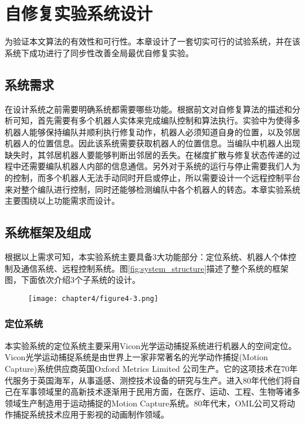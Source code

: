 \chapter{自修复实验系统设计}
为验证本文算法的有效性和可行性。本章设计了一套切实可行的试验系统，并在该系统下成功进行了同步性改善全局最优自修复实验。

\section{系统需求}
在设计系统之前需要明确系统都需要哪些功能。根据前文对自修复算法的描述和分析可知，首先需要有多个机器人实体来完成编队控制和算法执行。实验中为使得多机器人能够保持编队并顺利执行修复动作，机器人必须知道自身的位置，以及邻居机器人的位置信息。因此该系统需要获取机器人的位置信息。当编队中机器人出现缺失时，其邻居机器人要能够判断出邻居的丢失。在梯度扩散与修复状态传递的过程中还需要编队机器人内部的信息通信。另外对于系统的运行与停止需要我们人为的控制，而多个机器人无法手动同时开启或停止，所以需要设计一个远程控制平台来对整个编队进行控制，同时还能够检测编队中各个机器人的转态。本章实验系统主要围绕以上功能需求而设计。

\section{系统框架及组成}
根据以上需求可知，本实验系统主要具备3大功能部分：定位系统、机器人个体控制及通信系统、远程控制系统。图\ref{fig:system_structure}描述了整个系统的框架图，下面依次介绍3个子系统的设计。
\begin{figure}[!htbp]
	\centering
	\texttt{[image: chapter4/figure4-3.png]}
\end{figure}

\subsection{定位系统}
本实验系统的定位系统主要采用Vicon光学运动捕捉系统进行机器人的空间定位。Vicon光学运动捕捉系统是由世界上一家非常著名的光学动作捕捉(Motion Capture)系统供应商英国Oxford Metrics Limited 公司生产。它的这项技术在70年代服务于英国海军，从事遥感、测控技术设备的研究与生产。进入80年代他们将自己在军事领域里的高新技术逐渐用于民用方面，在医疗、运动、工程、生物等诸多领域生产制造用于运动捕捉的Motion Capture系统。80年代末，OML公司又将动作捕捉系统技术应用于影视的动画制作领域。
\begin{figure}[!htbp]
	\centering
\end{figure}

